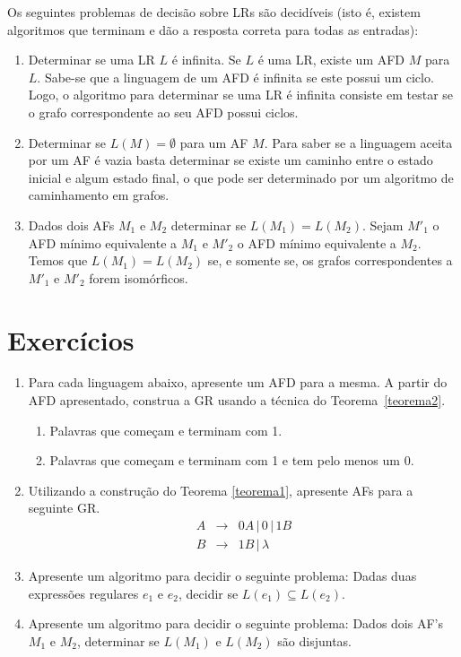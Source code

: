 \documentclass[a4paper]{article}
\theoremstyle{definition}
\begin{document}
  Os seguintes problemas de decisão sobre LRs são decidíveis (isto é, existem algoritmos
  que terminam e dão a resposta correta para todas as entradas):
  \begin{enumerate}
    \item Determinar se uma LR $L$ é infinita. Se $L$ é uma LR, existe um AFD
      $M$ para $L$. Sabe-se que a linguagem de um AFD é infinita se este possui
      um ciclo. Logo, o algoritmo para determinar se uma LR é infinita consiste
      em testar se o grafo correspondente ao seu AFD possui ciclos.
    \item Determinar se $L(M) = \emptyset$ para um AF $M$. Para saber se a
      linguagem aceita por um AF é vazia basta determinar se existe um caminho
      entre o estado inicial e algum estado final, o que pode ser determinado
      por um algoritmo de caminhamento em grafos.
    \item Dados dois AFs $M_1$ e $M_2$ determinar se $L(M_1) = L(M_2)$. Sejam
      $M'_1$ o AFD mínimo equivalente a $M_1$ e $M'_2$ o AFD mínimo equivalente
      a $M_2$. Temos que $L(M_1) = L(M_2)$ se, e somente se, os grafos
      correspondentes a $M'_1$ e $M'_2$ forem isomórficos.
  \end{enumerate}
  
  \section{Exercícios}

  \begin{enumerate}
     \item Para cada linguagem abaixo, apresente um AFD para a mesma. A partir
       do AFD apresentado, construa a GR usando a técnica do
       Teorema~\ref{teorema2}.
       \begin{enumerate}
         \item Palavras que começam e terminam com 1.
         \item Palavras que começam e terminam com 1 e tem pelo menos um 0.
         \end{enumerate}
      \item Utilizando a construção do Teorema \ref{teorema1}, apresente AFs
        para a seguinte GR.
    \[
      \begin{array}{lcl}
        A & \to & 0A \,|\,0\,|\,1B \\
        B & \to & 1B \,|\,\lambda
      \end{array}
    \]
      \item Apresente um algoritmo para decidir o seguinte problema: Dadas duas
        expressões regulares $e_1$  e $e_2$, decidir se $L(e_1) \subseteq
        L(e_2)$.
      \item Apresente um algoritmo para decidir o seguinte problema: Dados dois
        AF's $M_1$ e $M_2$, determinar se $L(M_1)$ e $L(M_2)$ são disjuntas.
      \end{enumerate}
\end{document}
